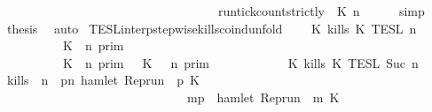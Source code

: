 \begin{isabellebody}
\ \ \ \ \ \ \ \ \ \ \ \ \ \ \ \ \ \ \ \ \ \ \ \ \ \ \ \ \ \ \ \ \ \ {\isasymle}\ {\isacharparenleft}run{\isacharunderscore}tick{\isacharunderscore}count{\isacharunderscore}strictly\ {\isasymrho}\ K\ n{\isacharparenright}{\isacartoucheclose}{\isacharbrackright}\isanewline
\ \ \ \ \isamarkupfalse%
\ simp\isanewline
\ \ \isamarkupfalse%
\ {\isacharquery}thesis\ \isamarkupfalse%
\ auto\isanewline
{}\isamarkupfalse%
%
\endisatagproof
{\isafoldproof}%
%
\isadelimproof
\isanewline
%
\endisadelimproof
\isanewline
{}\isamarkupfalse%
\ TESL{\isacharunderscore}interp{\isacharunderscore}stepwise{\isacharunderscore}kills{\isacharunderscore}coind{\isacharunderscore}unfold{\isacharcolon}\isanewline
\ \ \ {\isacartoucheopen}{\isasymlbrakk}\ K\ kills\ K\ {\isasymrbrakk}\isactrlsub T\isactrlsub E\isactrlsub S\isactrlsub L\isactrlbsup {\isasymge}\ n\isactrlesup \ {\isacharequal}\isanewline
\ \ \ \ \ \ {\isacharparenleft}\ \ \ {\isasymlbrakk}\ K\ {\isasymnot}{\isasymUp}\ n\ {\isasymrbrakk}\isactrlsub p\isactrlsub r\isactrlsub i\isactrlsub m\ \ \ \ \ \ \ \ \ \ \ \ \ \ \ \ \ \ \ \ \ \ \ \ %
\isanewline
\ \ \ \ \ \ \ \ {\isasymunion}\ {\isasymlbrakk}\ K\ {\isasymUp}\ n\ {\isasymrbrakk}\isactrlsub p\isactrlsub r\isactrlsub i\isactrlsub m\ {\isasyminter}\ {\isasymlbrakk}\ K\ {\isasymnot}{\isasymUp}\ {\isasymge}\ n\ {\isasymrbrakk}\isactrlsub p\isactrlsub r\isactrlsub i\isactrlsub m{\isacharparenright}\ \ \ \ %
\isanewline
\ \ \ \ \ \ {\isasyminter}\ {\isasymlbrakk}\ K\ kills\ K\ {\isasymrbrakk}\isactrlsub T\isactrlsub E\isactrlsub S\isactrlsub L\isactrlbsup {\isasymge}\ Suc\ n\isactrlesup {\isacartoucheclose}\isanewline
%
\isadelimproof
%
\endisadelimproof
%
\isatagproof
{}\isamarkupfalse%
\ {\isacharminus}\isanewline
\ \ \isamarkupfalse%
\ {\isacharquery}kills\ {\isacharequal}\ {\isacartoucheopen}{\isasymlambda}n\ {\isasymrho}{\isachardot}\ {\isasymforall}p{\isasymge}n{\isachardot}\ hamlet\ {\isacharparenleft}{\isacharparenleft}Rep{\isacharunderscore}run\ {\isasymrho}{\isacharparenright}\ p\ K\isanewline
\ \ \ \ \ \ \ \ \ \ \ \ \ \ \ \ \ \ \ \ \ \ \ \ \ \ \ \ \ {\isasymlongrightarrow}\ {\isacharparenleft}{\isasymforall}m{\isasymge}p{\isachardot}\ {\isasymnot}\ hamlet\ {\isacharparenleft}{\isacharparenleft}Rep{\isacharunderscore}run\ {\isasymrho}{\isacharparenright}\ m\ K\isanewline

\end{isabellebody}

